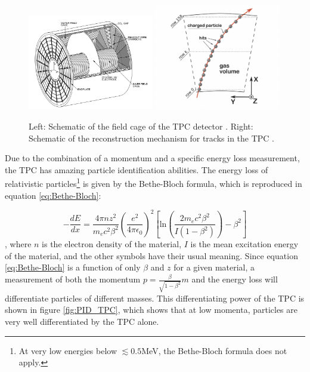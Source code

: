 \begin{figure}
    \centering
    \includegraphics[width=0.49\textwidth]{figures/tpc_cage.png}
    \includegraphics[width=0.49\textwidth]{figures/tpc_process.png}
    \caption{Left: Schematic of the field cage of the TPC detector \cite{}. Right: Schematic of the reconstruction mechanism for tracks in the TPC \cite{ALICE_TPC_trigger}.}
    \label{fig:TPC_schemtic}
\end{figure}

Due to the combination of a momentum and a specific energy loss measurement, the TPC has amazing particle identification abilities. The energy loss of relativistic particles\footnote{At very low energies below $\lesssim 0.5 $MeV, the Bethe-Bloch formula does not apply. } is given by the Bethe-Bloch formula, which is reproduced in equation \ref{eq:Bethe-Bloch}:

\begin{equation}\label{eq:Bethe-Bloch}
    -\frac{dE}{dx} = \frac{4\pi n z^2}{m_e c^2 \beta^2} \left( \frac{e^2}{4\pi \epsilon_0}\right)^2 \left[ \mathrm{ln}\left(\frac{2m_ec^2\beta^2}{I(1-\beta^2)}\right)-\beta^2 \right]
\end{equation}
, where $n$ is the electron density of the material, $I$ is the mean excitation energy of the material, and the other symbols have their usual meaning. Since equation \ref{eq:Bethe-Bloch} is a function of only $\beta$ and $z$ for a given material, a measurement of both the momentum $p=\frac{\beta}{\sqrt{1-\beta^2}}m$ and the energy loss will differentiate particles of different masses. This differentiating power of the TPC is shown in figure \ref{fig:PID_TPC}, which shows that at low momenta, particles are very well differentiated by the TPC alone. \\

